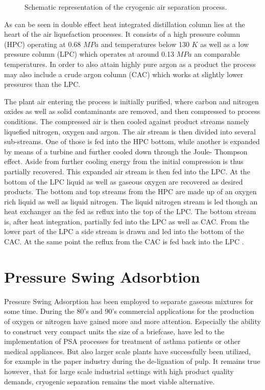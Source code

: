 \begin{figure}
	
	\caption[Air Separation Unit]{Schematic representation of the cryogenic air separation process.}
	\label{fig:ASU}
\end{figure}

As can be seen in  double effect heat integrated distillation column lies at the heart of the air 
liquefaction processes. It consists of a high pressure column (HPC) operating at 0.68 $MPa$ and 
temperatures below 130 $K$ as well as a low pressure column (LPC) which operates at around 0.13 
$MPa$ an comparable temperatures. In order to also attain highly pure argon as a product the process 
may also include a crude argon column (CAC) which works at slightly lower pressures than the LPC.

The plant air entering the process is initially purified, where carbon and nitrogen oxides as well as solid contaminants are removed, and then compressed to process conditions. The compressed air is then cooled 
against product streams namely liquefied nitrogen, oxygen and argon. The air stream is then divided into 
several sub-streams. One of those is fed into the HPC bottom, while another is expanded by means of a 
turbine and further cooled down through the Joule- Thompson effect. Aside from further cooling energy from 
the initial compression is thus partially recovered. This expanded air stream is then fed into the LPC. At the 
bottom of the LPC liquid as well as gaseous oxygen are recovered as desired products. The bottom and top 
streams from the HPC are made up of an oxygen rich liquid as well as liquid nitrogen. The liquid nitrogen 
stream is led though an heat exchanger an the fed as reflux into the top of the LPC. The bottom stream is, 
after heat integration, partially fed into the LPC as well as CAC. From the lower part of the LPC a side stream 
is drawn and led into the bottom of the CAC. At the same point the reflux from the CAC is fed back into the 
LPC \cite{Zhu.2010}.

\section{Pressure Swing Adsorbtion}
\label{sec:psa}



Pressure Swing Adsorption has been employed to separate gaseous mixtures for some time. During the 
80's and 90's commercial applications for the production of oxygen or nitrogen have gained more and 
more attention. Especially the ability to construct very compact units the size of a briefcase, have led to 
the implementation  of PSA processes for treatment of asthma patients or other medical appliances. But 
also larger scale plants have successfully been utilized, for example in the paper industry during the 
de-lignation of pulp. It remains true however, that for large scale industrial settings with high product 
quality demands, cryogenic separation remains the most viable alternative. 

